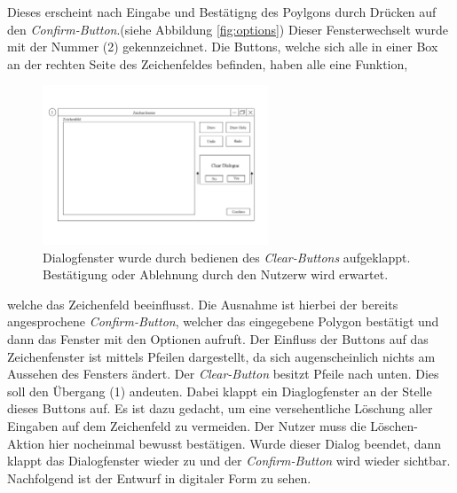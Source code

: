 Dieses erscheint nach Eingabe und Bestätigng des Poylgons durch Drücken auf den \emph{Confirm-Button}.(siehe Abbildung \ref{fig:options}) Dieser Fensterwechselt wurde mit der Nummer (2) gekennzeichnet. Die Buttons, welche sich alle in einer Box an der rechten Seite des Zeichenfeldes befinden, haben alle eine Funktion,
\begin{figure}
    \centering
    \includegraphics[width=0.6\textwidth]{bilder/cleardialogue.png}
    \caption[Öffnung des Dialogfensters]{Dialogfenster wurde durch bedienen des \emph{Clear-Buttons} aufgeklappt. Bestätigung oder Ablehnung durch den Nutzerw wird erwartet.}
    \label{fig:cleardia}
\end{figure}
welche das Zeichenfeld beeinflusst. 
Die Ausnahme ist hierbei der bereits angesprochene \emph{Confirm-Button}, welcher das eingegebene Polygon bestätigt und dann das Fenster mit den Optionen aufruft.
Der Einfluss der Buttons auf das Zeichenfenster ist mittels Pfeilen dargestellt, da sich augenscheinlich nichts am Aussehen des Fensters ändert.
Der \emph{Clear-Button} besitzt Pfeile nach unten. Dies soll den Übergang (1) andeuten. Dabei klappt ein Diaglogfenster an der Stelle dieses Buttons auf. Es ist dazu gedacht, um eine versehentliche Löschung aller Eingaben auf dem Zeichenfeld zu vermeiden.
Der Nutzer muss die Löschen-Aktion hier nocheinmal bewusst bestätigen. Wurde dieser Dialog beendet, dann klappt das Dialogfenster wieder zu und der  \emph{Confirm-Button} wird wieder sichtbar. Nachfolgend ist der Entwurf in digitaler Form zu sehen.    
